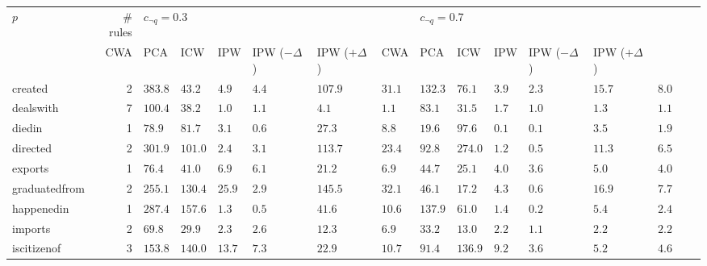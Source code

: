 \begin{tabular}{lr|lllllll|lllllll}
\toprule
           $p$ & \# rules & \multicolumn{6}{l}{$c_{\neg q}=0.3$} & \multicolumn{6}{l}{$c_{\neg q}=0.7$} \\
               &              CWA &     PCA &        ICW &         IPW & IPW ($-\Delta$) & IPW ($+\Delta$) &              CWA &     PCA &    ICW &        IPW & IPW ($-\Delta$) & IPW ($+\Delta$) \\
\midrule
       created &        2 &          $383.8$ &  $43.2$ &      $4.9$ &  $\bm{4.4}$ &         $107.9$ &          $31.1$ &          $132.3$ &  $76.1$ &  $3.9$ & $\bm{2.3}$ &          $15.7$ &           $8.0$ \\
     dealswith &        7 &          $100.4$ &  $38.2$ & $\bm{1.0}$ &       $1.1$ &           $4.1$ &           $1.1$ &           $83.1$ &  $31.5$ &  $1.7$ & $\bm{1.0}$ &           $1.3$ &           $1.1$ \\
        diedin &        1 &           $78.9$ &  $81.7$ &      $3.1$ &  $\bm{0.6}$ &          $27.3$ &           $8.8$ &           $19.6$ &  $97.6$ &  $0.1$ & $\bm{0.1}$ &           $3.5$ &           $1.9$ \\
      directed &        2 &          $301.9$ & $101.0$ & $\bm{2.4}$ &       $3.1$ &         $113.7$ &          $23.4$ &           $92.8$ & $274.0$ &  $1.2$ & $\bm{0.5}$ &          $11.3$ &           $6.5$ \\
       exports &        1 &           $76.4$ &  $41.0$ &      $6.9$ &  $\bm{6.1}$ &          $21.2$ &           $6.9$ &           $44.7$ &  $25.1$ &  $4.0$ & $\bm{3.6}$ &           $5.0$ &           $4.0$ \\
 graduatedfrom &        2 &          $255.1$ & $130.4$ &     $25.9$ &  $\bm{2.9}$ &         $145.5$ &          $32.1$ &           $46.1$ &  $17.2$ &  $4.3$ & $\bm{0.6}$ &          $16.9$ &           $7.7$ \\
    happenedin &        1 &          $287.4$ & $157.6$ &      $1.3$ &  $\bm{0.5}$ &          $41.6$ &          $10.6$ &          $137.9$ &  $61.0$ &  $1.4$ & $\bm{0.2}$ &           $5.4$ &           $2.4$ \\
       imports &        2 &           $69.8$ &  $29.9$ & $\bm{2.3}$ &       $2.6$ &          $12.3$ &           $6.9$ &           $33.2$ &  $13.0$ &  $2.2$ & $\bm{1.1}$ &           $2.2$ &           $2.2$ \\
   iscitizenof &        3 &          $153.8$ & $140.0$ &     $13.7$ &  $\bm{7.3}$ &          $22.9$ &          $10.7$ &           $91.4$ & $136.9$ &  $9.2$ & $\bm{3.6}$ &           $5.2$ &           $4.6$ \\

\end{tabular}
